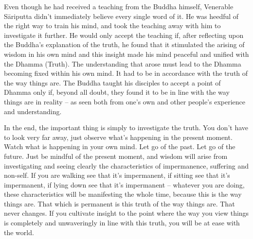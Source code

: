 Even though he had received a teaching from the Buddha himself, Venerable S\=ariputta didn't immediately believe every single word of it. He was heedful of the right way to train his mind, and took the teaching away with him to investigate it further. He would only accept the teaching if, after reflecting upon the Buddha's explanation of the truth, he found that it stimulated the arising of wisdom in his own mind and this insight made his mind peaceful and unified with the Dhamma (Truth). The understanding that arose must lead to the Dhamma becoming fixed within his own mind. It had to be in accordance with the truth of the way things are. The Buddha taught his disciples to accept a point of Dhamma only if, beyond all doubt, they found it to be in line with the way things are in reality -- as seen both from one's own and other people's experience and understanding.

In the end, the important thing is simply to investigate the truth. You don't have to look very far away, just observe what's happening in the present moment. Watch what is happening in your own mind. Let go of the past. Let go of the future. Just be mindful of the present moment, and wisdom will arise from investigating and seeing clearly the characteristics of impermanence, suffering and non-self. If you are walking see that it's impermanent, if sitting see that it's impermanent, if lying down see that it's impermanent -- whatever you are doing, these characteristics will be manifesting the whole time, because this is the way things are. That which is permanent is this truth of the way things are. That never changes. If you cultivate insight to the point where the way you view things is completely and unwaveringly in line with this truth, you will be at ease with the world. 

